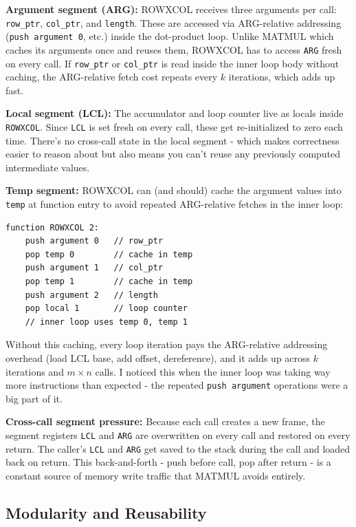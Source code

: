 \documentclass[12pt,a4paper]{article}
\begin{document}
\textbf{Argument segment (ARG):} ROWXCOL receives three arguments per call: \texttt{row\_ptr}, \texttt{col\_ptr}, and \texttt{length}. These are accessed via ARG-relative addressing (\texttt{push argument 0}, etc.) inside the dot-product loop. Unlike MATMUL which caches its arguments once and reuses them, ROWXCOL has to access \texttt{ARG} fresh on every call. If \texttt{row\_ptr} or \texttt{col\_ptr} is read inside the inner loop body without caching, the ARG-relative fetch cost repeats every $k$ iterations, which adds up fast.

\textbf{Local segment (LCL):} The accumulator and loop counter live as locals inside \texttt{ROWXCOL}. Since \texttt{LCL} is set fresh on every call, these get re-initialized to zero each time. There's no cross-call state in the local segment - which makes correctness easier to reason about but also means you can't reuse any previously computed intermediate values.

\textbf{Temp segment:} ROWXCOL can (and should) cache the argument values into \texttt{temp} at function entry to avoid repeated ARG-relative fetches in the inner loop:

\begin{lstlisting}[style=pseudo, caption={Caching arguments into temp inside ROWXCOL}]
function ROWXCOL 2:
    push argument 0   // row_ptr
    pop temp 0        // cache in temp
    push argument 1   // col_ptr
    pop temp 1        // cache in temp
    push argument 2   // length
    pop local 1       // loop counter
    // inner loop uses temp 0, temp 1
\end{lstlisting}

Without this caching, every loop iteration pays the ARG-relative addressing overhead (load LCL base, add offset, dereference), and it adds up across $k$ iterations and $m \times n$ calls. I noticed this when the inner loop was taking way more instructions than expected - the repeated \texttt{push argument} operations were a big part of it.

\textbf{Cross-call segment pressure:} Because each call creates a new frame, the segment registers \texttt{LCL} and \texttt{ARG} are overwritten on every call and restored on every return. The caller's \texttt{LCL} and \texttt{ARG} get saved to the stack during the call and loaded back on return. This back-and-forth - push before call, pop after return - is a constant source of memory write traffic that MATMUL avoids entirely.

\subsection{Modularity and Reusability}
\end{document}
